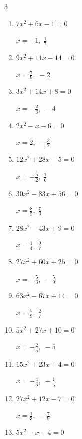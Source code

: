 \begin{multicols}{3}
\begin{enumerate}
        $\displaystyle x=\frac{2}{3},\; \frac{7}{9}$

  \item $7x^{2}+6x-1=0$

        $\displaystyle x=-1,\; \frac{1}{7}$

  \item $9x^{2}+11x-14=0$

        $\displaystyle x=\frac{7}{9},\; -2$

  \item $3x^{2}+14x+8=0$

        $\displaystyle x=-\frac{2}{3},\; -4$

  \item $2x^{2}-x-6=0$

        $\displaystyle x=2,\; -\frac{3}{2}$

  \item $12x^{2}+28x-5=0$

        $\displaystyle x=-\frac{5}{2},\; \frac{1}{6}$

  \item $30x^{2}-83x+56=0$

        $\displaystyle x=\frac{8}{5},\; \frac{7}{6}$

  \item $28x^{2}-43x+9=0$

        $\displaystyle x=\frac{1}{4},\; \frac{9}{7}$

  \item $27x^{2}+60x+25=0$

        $\displaystyle x=-\frac{5}{3},\; -\frac{5}{9}$

  \item $63x^{2}-67x+14=0$

        $\displaystyle x=\frac{7}{9},\; \frac{2}{7}$

\columnbreak %

  \item $5x^{2}+27x+10=0$

        $\displaystyle x=-\frac{2}{5},\; -5$

  \item $15x^{2}+23x+4=0$

        $\displaystyle x=-\frac{4}{3},\; -\frac{1}{5}$

  \item $27x^{2}+12x-7=0$

        $\displaystyle x=\frac{1}{3},\; -\frac{7}{9}$

  \item $5x^{2}-x-4=0$


\end{enumerate}
\end{multicols}
